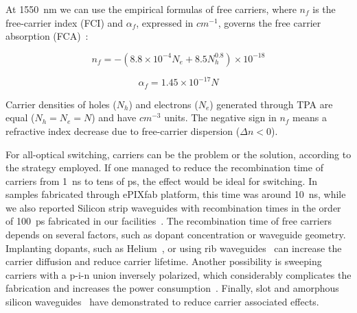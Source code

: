 At 1550~nm we can use the empirical formulas of free carriers, where $n_f$ is the free-carrier index (FCI) and $\alpha_f$, expressed in $cm^{-1}$, governs the free carrier absorption (FCA)~\cite{Lin2007,Soref1987}:


\begin{equation} 
n_f = -(8.8\times 10^{-4}N_e+8.5N_h^{0.8})\times 10^{-18}
\label{eq:fcd}
\end{equation}

\begin{equation} 
\alpha_f = 1.45\times 10^{-17} N
\label{eq:fca}
\end{equation}

Carrier densities of holes ($N_h$) and electrons ($N_e$) generated through TPA are equal ($N_h=N_e=N$) and have $cm^{-3}$ units.
The negative sign in $n_f$ means a refractive index decrease due to free-carrier dispersion ($\Delta n<0$).



% 

% 

For all-optical switching, carriers can be the problem or the solution, according to the strategy employed.
If one managed to reduce the recombination time of carriers from 1~ns to tens of ps, the effect would be ideal for switching.
In samples fabricated through ePIXfab platform, this time was around 10~ns, while we also reported Silicon strip waveguides with recombination times in the order of 100~ps fabricated in our facilities~\cite{Oton,optoel}.
The recombination time of free carriers depends on several factors, such as dopant concentration or waveguide geometry.
Implanting dopants, such as Helium~\cite{Liu2006}, or using rib waveguides~\cite{Dimitropoulos2005} can increase the carrier diffusion and reduce carrier lifetime.
Another possibility is sweeping carriers with a p-i-n union inversely polarized, which considerably complicates the fabrication and increases the power consumption~\cite{Turner-Foster2010}.
Finally, slot \cite{Matres:12} and amorphous silicon waveguides~\cite{Matres2013} have demonstrated to reduce carrier associated effects.


\pagestyle{plain}



